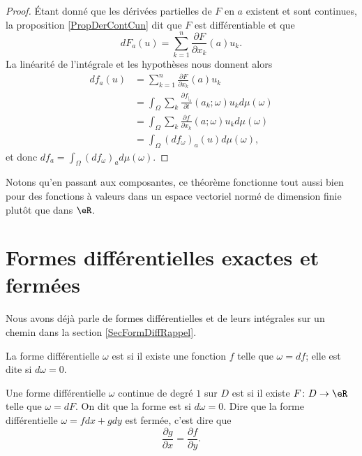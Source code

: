 \begin{proof}
    Étant donné que les dérivées partielles de \( F\) en \( a\) existent et sont continues, la proposition \ref{PropDerContCun} dit que \( F\) est différentiable et que
    \begin{equation}
        dF_a(u)=\sum_{k=1}^n\frac{ \partial F }{ \partial x_k }(a)u_k.
    \end{equation}
    La linéarité de l'intégrale et les hypothèses nous donnent alors
    \begin{subequations}
        \begin{align}
            df_a(u)&=\sum_{k=1}^n\frac{ \partial F }{ \partial x_k }(a)u_k\\
            &=\int_{\Omega}\sum_k\frac{ \partial f_{|_k} }{ \partial t }(a_k;\omega)u_kd\mu(\omega)\\
            &=\int_{\Omega}\sum_k\frac{ \partial f }{ \partial x_k }(a;\omega)u_kd\mu(\omega)\\
            &=\int_{\Omega}(df_{\omega})_a(u)d\mu(\omega),
        \end{align}
    \end{subequations}
    et donc \( df_a=\int_{\Omega}(df_{\omega})_ad\mu(\omega)\).
\end{proof}
Notons qu'en passant aux composantes, ce théorème fonctionne tout aussi bien pour des fonctions à valeurs dans un espace vectoriel normé de dimension finie plutôt que dans \( \eR\).

\section{Formes différentielles exactes et fermées}

Nous avons déjà parle de formes différentielles et de leurs intégrales sur un chemin dans la section \ref{SecFormDiffRappel}.

\begin{definition}  \label{DefEFKQmPs}
La forme différentielle $\omega$ est  si il existe une fonction $f$ telle que $\omega=df$; elle est dite  si $d\omega=0$.
\end{definition}

Une forme différentielle $\omega$ continue de degré $1$ sur $D$ est  si il existe $F\colon D\to \eR$ telle que $\omega=dF$. On dit que la forme est  si $d\omega=0$. Dire que la forme différentielle $\omega=fdx+gdy$ est fermée, c'est dire que
\begin{equation}
    \frac{ \partial g }{ \partial x }=\frac{ \partial f }{ \partial y }.
\end{equation}

